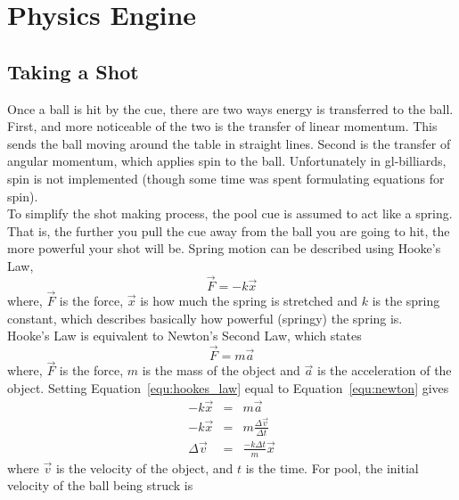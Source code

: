 
\section{Physics Engine}

    \subsection{Taking a Shot}
    Once a ball is hit by the cue, there are two ways energy is transferred to the ball. First, and more noticeable of the two
    is the transfer of linear momentum. This sends the ball moving around the table in straight lines. Second is the transfer
    of angular momentum, which applies spin to the ball. Unfortunately in gl-billiards, spin is not implemented (though some
    time was spent formulating equations for spin). \\
    To simplify the shot making process, the pool cue is assumed to act like a spring. That is, the further you pull
    the cue away from the ball you are going to hit, the more powerful your shot will be. Spring motion can be described
    using Hooke's Law,
    \begin{equation}
        \vec F = -k \vec x
        \label{equ:hookes_law}
    \end{equation}
    where, $\vec F$ is the force, $\vec x$ is how much the spring is stretched and $k$ is the spring constant, which
    describes basically how powerful (springy) the spring is.
    \\
    Hooke's Law is equivalent to Newton's Second Law, which states
    \begin{equation}
        \vec F = m \vec a
        \label{equ:newton}
    \end{equation}
    where, $\vec F$ is the force, $m$ is the mass of the object and $\vec a$ is the acceleration of the object. Setting
    Equation~\ref{equ:hookes_law} equal to Equation~\ref{equ:newton} gives
    \begin{eqnarray}
        -k \vec x &=& m \vec a \nonumber \\
        -k \vec x &=& m \frac{\Delta \vec v}{\Delta t} \nonumber \\
        \Delta \vec v &=& \frac{-k \Delta t}{m}\vec x  \nonumber
    \end{eqnarray}
    where $\vec v$ is the velocity of the object, and $t$ is the time. For pool, the initial velocity of the ball being struck is
